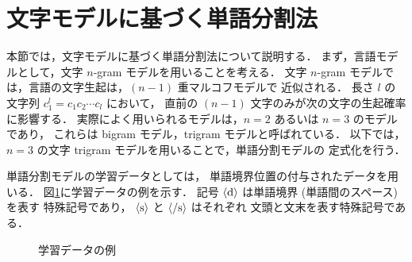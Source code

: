 \section{文字モデルに基づく単語分割法}

本節では，文字モデルに基づく単語分割法\cite{Oda99a,Oda99b}について説明する．
まず，言語モデルとして，文字 $n$-gram モデルを用いることを考える．
文字 $n$-gram モデルでは，言語の文字生起は，$(n-1)$ 重マルコフモデルで
近似される．
長さ $l$ の文字列 $c_1^l = c_1 c_2 \cdots c_l$ において，
直前の $(n-1)$ 文字のみが次の文字の生起確率に影響する．
実際によく用いられるモデルは，$n = 2$ あるいは $n = 3$ のモデルであり，
これらは bigram モデル，trigram モデルと呼ばれている．
以下では，$n = 3$ の文字 trigram モデルを用いることで，単語分割モデルの
定式化を行う．

単語分割モデルの学習データとしては，
単語境界位置の付与されたデータを用いる．
図\ref{Fig:training}に学習データの例を示す．
記号 $\langle {\rm d}\rangle$ は単語境界 (単語間のスペース) を表す
特殊記号であり，
$\langle {\rm s}\rangle$ と $\langle {\rm /s}\rangle$ はそれぞれ
文頭と文末を表す特殊記号である．
\begin{figure}[hbt]
\begin{center}
\end{center}
\caption{学習データの例}
\label{Fig:training}
\end{figure}

